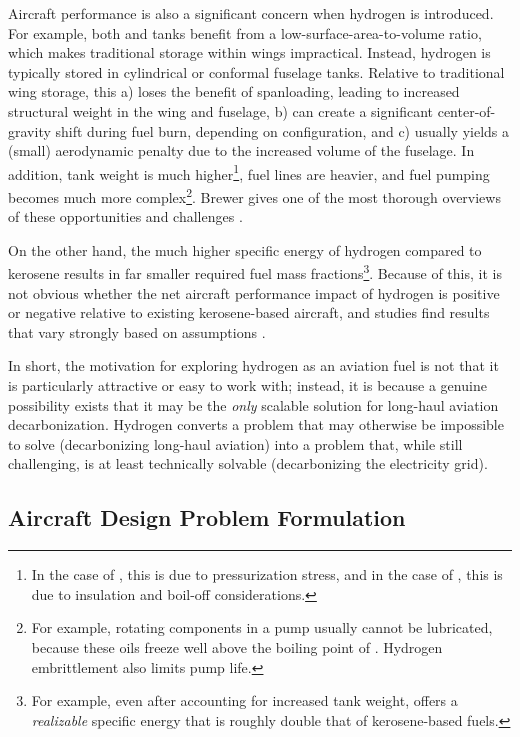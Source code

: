 Aircraft performance is also a significant concern when hydrogen is introduced. For example, both \lh and \gh tanks benefit from a low-surface-area-to-volume ratio, which makes traditional storage within wings impractical. Instead, hydrogen is typically stored in cylindrical or conformal fuselage tanks. Relative to traditional wing storage, this a) loses the benefit of spanloading, leading to increased structural weight in the wing and fuselage, b) can create a significant center-of-gravity shift during fuel burn, depending on configuration, and c) usually yields a (small) aerodynamic penalty due to the increased volume of the fuselage. In addition, tank weight is much higher\footnote{In the case of \gh, this is due to pressurization stress, and in the case of \lh, this is due to insulation and boil-off considerations.}, fuel lines are heavier, and fuel pumping becomes much more complex\footnote{For example, rotating components in a pump usually cannot be lubricated, because these oils freeze well above the boiling point of \lh. Hydrogen embrittlement also limits pump life.}. Brewer gives one of the most thorough overviews of these opportunities and challenges \cite{brewer_hydrogen_1991}.

On the other hand, the much higher specific energy of hydrogen compared to kerosene results in far smaller required fuel mass fractions\footnote{For example, even after accounting for increased tank weight, \lh offers a \emph{realizable} specific energy that is roughly double that of kerosene-based fuels.}. Because of this, it is not obvious whether the net aircraft performance impact of hydrogen is positive or negative relative to existing kerosene-based aircraft, and studies find results that vary strongly based on assumptions \cite{cascade, gaubatz_estimating_2023, tiwari_review_2024}.

In short, the motivation for exploring hydrogen as an aviation fuel is not that it is particularly attractive or easy to work with; instead, it is because a genuine possibility exists that it may be the \emph{only} scalable solution for long-haul aviation decarbonization. Hydrogen converts a problem that may otherwise be impossible to solve (decarbonizing long-haul aviation) into a problem that, while still challenging, is at least technically solvable (decarbonizing the electricity grid).

\subsection{Aircraft Design Problem Formulation}

